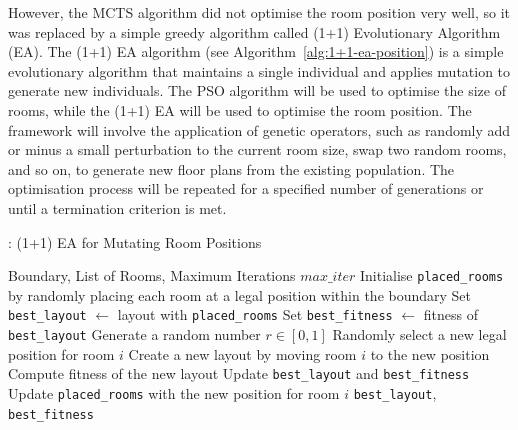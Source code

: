 \documentclass[]{article}
\begin{document}
However, the MCTS algorithm did not optimise the room position very well, so it was replaced by a simple greedy algorithm called (1+1) Evolutionary Algorithm (EA). The (1+1) EA algorithm (see Algorithm~\ref{alg:1+1-ea-position}) is a simple evolutionary algorithm that maintains a single individual and applies mutation to generate new individuals. The PSO algorithm will be used to optimise the size of rooms, while the (1+1) EA will be used to optimise the room position. The framework will involve the application of genetic operators, such as randomly add or minus a small perturbation to the current room size, swap two random rooms, and so on, to generate new floor plans from the existing population. The optimisation process will be repeated for a specified number of generations or until a termination criterion is met.

\begin{algorithm}[H]
    \caption{: (1+1) EA for Mutating Room Positions}
    \label{alg:1+1-ea-position}
    \begin{algorithmic}[1]
        \REQUIRE Boundary, List of Rooms, Maximum Iterations $max\_iter$
        \STATE Initialise \texttt{placed\_rooms} by randomly placing each room at a legal position within the boundary
        \STATE Set \texttt{best\_layout} $\gets$ layout with \texttt{placed\_rooms}
        \STATE Set \texttt{best\_fitness} $\gets$ fitness of \texttt{best\_layout}
        \STATE Generate a random number $r \in [0,1]$
        \STATE Randomly select a new legal position for room $i$
        \STATE Create a new layout by moving room $i$ to the new position
        \STATE Compute fitness of the new layout
        \STATE Update \texttt{best\_layout} and \texttt{best\_fitness}
        \STATE Update \texttt{placed\_rooms} with the new position for room $i$
        \ENDIF
        \ENDIF
        \ENDFOR
        \ENDFOR
        \RETURN \texttt{best\_layout}, \texttt{best\_fitness}
    \end{algorithmic}
\end{algorithm}
\end{document}

